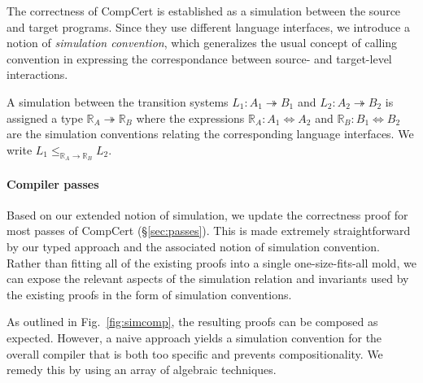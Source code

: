 \documentclass[sigplan,10pt,review,anonymous]{acmart}
\begin{document}
The correctness of CompCert is established as
a simulation between the source and target programs.
Since they use different language interfaces,
we introduce a notion of \emph{simulation convention},
which generalizes the usual concept of calling convention
in expressing the correspondance between
source- and target-level interactions.

A simulation between the transition systems
$L_1 : A_1 \twoheadrightarrow B_1$ and
$L_2 : A_2 \twoheadrightarrow B_2$
is assigned a type $\mathbb{R}_A \twoheadrightarrow \mathbb{R}_B$
where the expressions
$\mathbb{R}_A : A_1 \Leftrightarrow A_2$ and
$\mathbb{R}_B : B_1 \Leftrightarrow B_2$
are the simulation conventions
relating the corresponding language interfaces.
We write
$L_1 \le_{\mathbb{R}_A \rightarrow \mathbb{R}_B} L_2$.


\paragraph{Compiler passes} %

Based on our extended notion of simulation,
we update the correctness proof for
most passes of CompCert (\S\ref{sec:passes}).
This is made extremely straightforward by
our typed approach and the associated notion of simulation convention.
Rather than fitting all of the existing proofs into a single
one-size-fits-all mold,
we can expose the relevant aspects of
the simulation relation and invariants used by the existing proofs
in the form of simulation conventions.

As outlined in Fig.~\ref{fig:simcomp},
the resulting proofs can be composed as expected.
However,
a naive approach yields a simulation convention
for the overall compiler
that is both too specific and prevents compositionality.
We remedy this by using an array of algebraic techniques.

\end{document}
